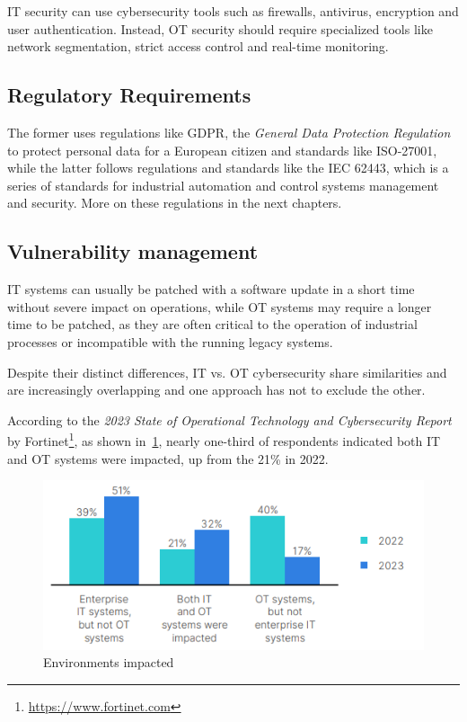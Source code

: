 IT security can use cybersecurity tools such as firewalls, antivirus, encryption and user authentication. Instead, OT security should require specialized tools like network segmentation, strict access control and real-time monitoring.

\subsection{Regulatory Requirements}

The former uses regulations like GDPR, the \textit{General Data Protection Regulation} to protect personal data for a European citizen and standards like ISO-27001, while the latter follows regulations and standards like the IEC 62443, which is a series of standards for industrial automation and control systems management and security. More on these regulations in the next chapters.

\subsection{Vulnerability management}

IT systems can usually be patched with a software update in a short time without severe impact on operations, while OT systems may require a longer time to be patched, as they are often critical to the operation of industrial processes or incompatible with the running legacy systems.

Despite their distinct differences, IT vs. OT cybersecurity share similarities and are increasingly overlapping and one approach has not to exclude the other.

According to the \textit{2023 State of Operational Technology and Cybersecurity Report} by Fortinet\footnote{\url{https://www.fortinet.com}}, as shown in~\cref{fig:fortinet-intrusions-env-impacted}, nearly one-third of respondents indicated both IT and OT systems were impacted, up from the 21\% in 2022.

\begin{figure}[h]
  \centering
  \includegraphics[scale=0.8]{chapters/02/assets/fortinet-intrusions-env-impacted.png}
  \caption[Environments impacted]{Environments impacted}
  \label{fig:fortinet-intrusions-env-impacted}
\end{figure}


